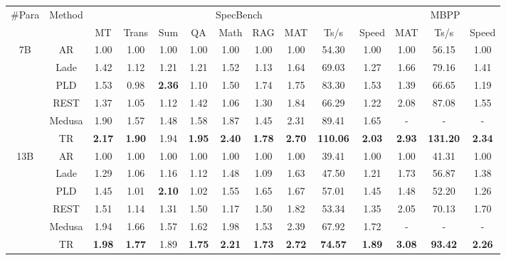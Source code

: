 \begin{table}[ht]
\centering
\small
\begin{tabular}{cc|cccccc|ccc|ccc}
\toprule
\multirow{2}{*}{\#Para} & \multirow{2}{*}{Method} & \multicolumn{9}{c|}{SpecBench} & \multicolumn{3}{c}{MBPP} \\ \cmidrule{3-11} \cmidrule{12-14}
 &  & MT & Trans & Sum & QA & Math & RAG & MAT & Ts/s & Speed & MAT & Ts/s & Speed \\
 \midrule
\multirow{6}{*}{7B}
~ & AR & 1.00 & 1.00 & 1.00 & 1.00 & 1.00 & 1.00 & 1.00 & 54.30 & 1.00 & 1.00 & 56.15 & 1.00 \\
~ & Lade & 1.42 & 1.12 & 1.21 & 1.21 & 1.52 & 1.13 & 1.64 & 69.03 & 1.27 & 1.66 & 79.16 & 1.41 \\
~ & PLD & 1.53 & 0.98 & \textbf{2.36} & 1.10 & 1.50 & 1.74 & 1.75 & 83.30 & 1.53 & 1.39 & 66.65 & 1.19 \\
~ & REST & 1.37 & 1.05 & 1.12 & 1.42 & 1.06 & 1.30 & 1.84 & 66.29 & 1.22 & 2.08 & 87.08 & 1.55 \\
\rowcolor[RGB]{230, 230, 230} \cellcolor{white} ~ & Medusa & 1.90 & 1.57 & 1.48 & 1.58 & 1.87 & 1.45 & 2.31 & 89.41 & 1.65 & - & - & - \\
~ & TR & \textbf{2.17} & \textbf{1.90} & 1.94 & \textbf{1.95} & \textbf{2.40} & \textbf{1.78} & \textbf{2.70} & \textbf{110.06} & \textbf{2.03} & \textbf{2.93} & \textbf{131.20} & \textbf{2.34} \\
 \midrule
\multirow{6}{*}{13B}
~ & AR & 1.00 & 1.00 & 1.00 & 1.00 & 1.00 & 1.00 & 1.00 & 39.41 & 1.00 & 1.00 & 41.31 & 1.00 \\
~ & Lade & 1.29 & 1.06 & 1.16 & 1.12 & 1.48 & 1.09 & 1.63 & 47.50 & 1.21 & 1.73 & 56.87 & 1.38 \\
~ & PLD & 1.45 & 1.01 & \textbf{2.10} & 1.02 & 1.55 & 1.65 & 1.67 & 57.01 & 1.45 & 1.48 & 52.20 & 1.26 \\
~ & REST & 1.51 & 1.14 & 1.31 & 1.50 & 1.17 & 1.50 & 1.82 & 53.34 & 1.35 & 2.05 & 70.13 & 1.70 \\
\rowcolor[RGB]{230, 230, 230} \cellcolor{white} ~ & Medusa & 1.94 & 1.66 & 1.57 & 1.62 & 1.98 & 1.53 & 2.39 & 67.92 & 1.72 & - & - & - \\
~ & TR & \textbf{1.98} & \textbf{1.77} & 1.89 & \textbf{1.75} & \textbf{2.21} & \textbf{1.73} & \textbf{2.72} & \textbf{74.57} & \textbf{1.89} & \textbf{3.08} & \textbf{93.42} & \textbf{2.26} \\

\end{tabular}
\end{table}
